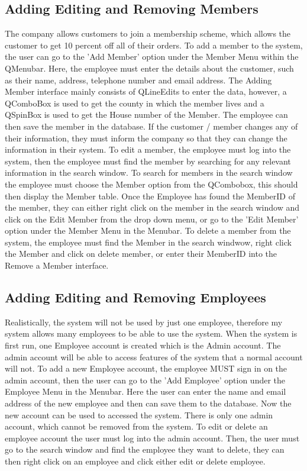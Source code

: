 \subsection{Adding Editing and Removing Members}
The company allows customers to join a membership scheme, which allows the customer to get 10 percent off all of their orders. To add a member to the system, the user can go to the 'Add Member' option under the Member Menu within the QMenubar. Here, the employee must enter the details about the customer, such as their name, address, telephone number and email address. The Adding Member interface mainly consists of QLineEdits to enter the data, however, a QComboBox is used to get the county in which the member lives and a QSpinBox is used to get the House number of the Member. The employee can then save the member in the database. If the customer / member changes any of their information, they must inform the company so that they can change the information in their system. To edit a member, the employee must log into the system, then the employee must find the member by searching for any relevant information in the search window. To search for members in the search window the employee must choose the Member option from the QCombobox, this should then display the Member table. Once the Employee has found the MemberID of the member, they can either right click on the member in the search window and click on the Edit Member from the drop down menu, or go to the 'Edit Member' option under the Member Menu in the Menubar. To delete a member from the system, the employee must find the Member in the search windwow, right click the Member and click on delete member, or enter their MemberID into the Remove a Member interface.

\subsection{Adding Editing and Removing Employees}
Realistically, the system will not be used by just one employee, therefore my system allows many employees to be able to use the system. When the system is first run, one Employee account is created which is the Admin account. The admin account will be able to access features of the system that a normal account will not. To add a new Employee account, the employee MUST sign in on the admin account, then the user can go to the 'Add Employee' option under the Employee Menu in the Menubar. Here the user can enter the name and email address of the new employee and then can save them to the database. Now the new account can be used to accessed the system. There is only one admin account, which cannot be removed from the system.
To edit or delete an employee account the user must log into the admin account. Then, the user must go to the search window and find the employee they want to delete, they can then right click on an employee and click either edit or delete employee.


